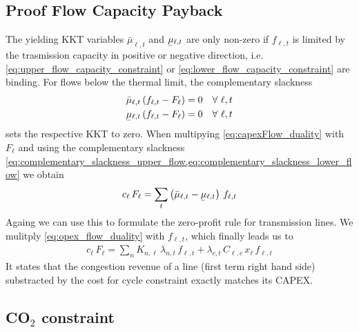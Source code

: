 \documentclass[11pt,twocolumn]{article}
\newcommand{\ubar}[1]{\underaccent{\bar}{#1}}
\newcommand{\Forall}[1]{\hspace{10pt} \forall \,\, #1 }
\newcommand{\flow}{f_{\ell,t}}
\newcommand{\capacityflow}{F_{\ell}}
\newcommand{\capitalpriceflow}{c_{\ell}}
\newcommand{\mulowerflow}{\ubar{\mu}_{\ell,t}}
\newcommand{\muupperflow}{\bar{\mu}_{\ell,t}}
\newcommand{\lmp}[1][n]{\lambda_{#1,t}}
\newcommand{\incidence}[1][n]{K_{#1,\ell}}
\newcommand{\cycle}{C_{\ell,c}}
\newcommand{\impedance}{x_\ell}
\newcommand{\cycleprice}{\lambda_{c,t}}
\begin{document}
\subsection{Proof Flow Capacity Payback}
\label{sec:zero_profit_flow}

The yielding KKT variables $\muupperflow$ and $\mulowerflow$ are only non-zero if $\flow$ is limited by the trasmission capacity in positive or negative direction, i.e. \cref{eq:upper_flow_capacity_constraint} or \cref{eq:lower_flow_capacity_constraint} are binding. For flows below the thermal limit, the complementary slackness 
\begin{align}
\muupperflow \left( \flow - \capacityflow \right)  &= 0 \Forall{\ell,t}
\label{eq:complementary_slackness_upper_flow} \\
\mulowerflow \left( \flow - \capacityflow \right) &=  0 \Forall{\ell,t}
\label{eq:complementary_slackness_lower_flow} 
\end{align}
sets the respective KKT to zero. 
When multipying \cref{eq:capexFlow_duality} with $\capacityflow$ and using the complementary slackness \cref{eq:complementary_slackness_upper_flow,eq:complementary_slackness_lower_flow} we obtain 
\begin{align}
 \capitalpriceflow \, \capacityflow = \sum_t \left( \muupperflow - \mulowerflow \right)  \, \flow
 \label{eq:capital_price_flow_sum}
\end{align}
Againg we can use this to formulate the zero-profit rule for transmission lines. We mulitply \cref{eq:opex_flow_duality} with $\flow$, which finally leads us to 
\begin{align}
\capitalpriceflow \, \capacityflow = \sum_n \incidence\, \lmp\, \flow + \cycleprice\, \cycle\, \impedance\, \flow 
\end{align}
It states that the congestion revenue of a line (first term right hand side) substracted by the cost for cycle constraint exactly matches its CAPEX. 





\subsection{CO$_2$ constraint}
\end{document}
